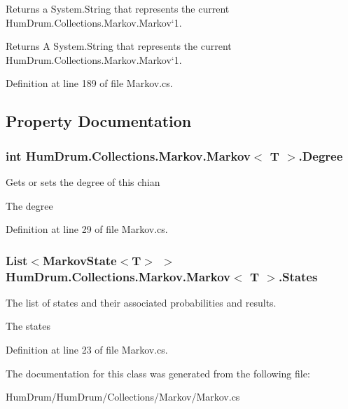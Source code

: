 Returns a System.\+String that represents the current Hum\+Drum.\+Collections.\+Markov.\+Markov`1. 

\begin{DoxyReturn}{Returns}
A System.\+String that represents the current Hum\+Drum.\+Collections.\+Markov.\+Markov`1.
\end{DoxyReturn}


Definition at line 189 of file Markov.\+cs.



\subsection{Property Documentation}
\hypertarget{classHumDrum_1_1Collections_1_1Markov_1_1Markov_a35d0586c1f941ee548203a596378da81}{}
\subsubsection[{Degree}]{\setlength{\rightskip}{0pt plus 5cm}int {\bf Hum\+Drum.\+Collections.\+Markov.\+Markov}$<$ T $>$.Degree\hspace{0.3cm}{\ttfamily [get]}}\label{classHumDrum_1_1Collections_1_1Markov_1_1Markov_a35d0586c1f941ee548203a596378da81}


Gets or sets the degree of this chian 

The degree

Definition at line 29 of file Markov.\+cs.

\hypertarget{classHumDrum_1_1Collections_1_1Markov_1_1Markov_a71899515d7da8d3078ec114a7b622a5f}{}
\subsubsection[{States}]{\setlength{\rightskip}{0pt plus 5cm}List$<${\bf Markov\+State}$<$T$>$ $>$ {\bf Hum\+Drum.\+Collections.\+Markov.\+Markov}$<$ T $>$.States\hspace{0.3cm}{\ttfamily [get]}}\label{classHumDrum_1_1Collections_1_1Markov_1_1Markov_a71899515d7da8d3078ec114a7b622a5f}


The list of states and their associated probabilities and results. 

The states

Definition at line 23 of file Markov.\+cs.



The documentation for this class was generated from the following file\+:\begin{DoxyCompactItemize}
\item 
Hum\+Drum/\+Hum\+Drum/\+Collections/\+Markov/Markov.\+cs\end{DoxyCompactItemize}
